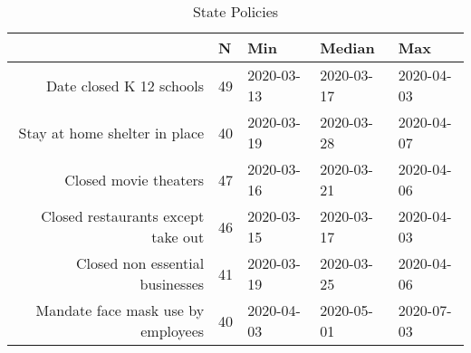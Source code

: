 \begin{table}[ht]
\centering
\begin{tabular}{rllll}
  \hline
 & N & Min & Median & Max \\ 
  \hline
Date closed K 12 schools & 49 & 2020-03-13 & 2020-03-17 & 2020-04-03 \\ 
  Stay at home  shelter in place & 40 & 2020-03-19 & 2020-03-28 & 2020-04-07 \\ 
  Closed movie theaters & 47 & 2020-03-16 & 2020-03-21 & 2020-04-06 \\ 
  Closed restaurants except take out & 46 & 2020-03-15 & 2020-03-17 & 2020-04-03 \\ 
  Closed non essential businesses & 41 & 2020-03-19 & 2020-03-25 & 2020-04-06 \\ 
  Mandate face mask use by employees & 40 & 2020-04-03 & 2020-05-01 & 2020-07-03 \\ 
   \hline
\end{tabular}
\caption{State Policies \label{tab:policies_inreg}} 
\end{table}
